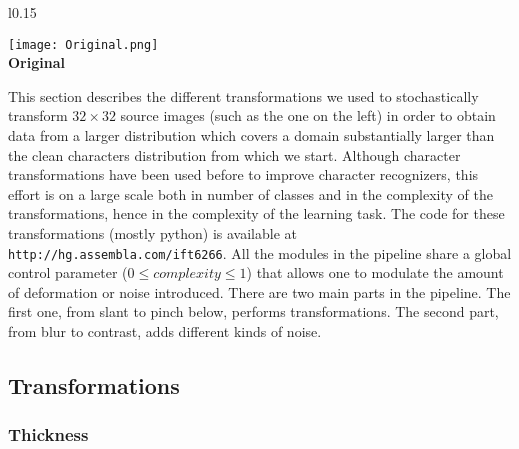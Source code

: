 \documentclass{article} %
\begin{document}
\begin{wrapfigure}[8]{l}{0.15\textwidth}
\begin{center}
\texttt{[image: Original.png]}\\
{\bf Original}
\end{center}
\end{wrapfigure}
This section describes the different transformations we used to stochastically
transform $32 \times 32$ source images (such as the one on the left)
in order to obtain data from a larger distribution which
covers a domain substantially larger than the clean characters distribution from
which we start. 
Although character transformations have been used before to
improve character recognizers, this effort is on a large scale both
in number of classes and in the complexity of the transformations, hence
in the complexity of the learning task.
The code for these transformations (mostly python) is available at 
{\tt http://hg.assembla.com/ift6266}. All the modules in the pipeline share
a global control parameter ($0 \le complexity \le 1$) that allows one to modulate the
amount of deformation or noise introduced. 
There are two main parts in the pipeline. The first one,
from slant to pinch below, performs transformations. The second
part, from blur to contrast, adds different kinds of noise.

\subsection{Transformations}

\subsubsection*{Thickness}
\end{document}
